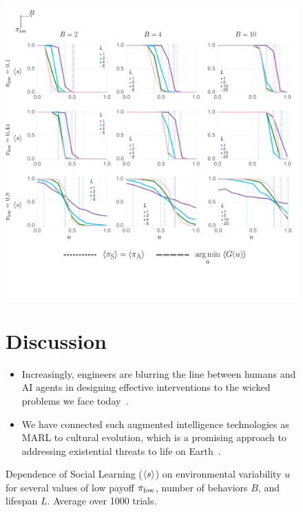 \documentclass[letterpaper,11.5pt]{scrartcl}
\begin{document}
\begin{figure}
  \caption{Dependence of Social Learning ($\langle s \rangle$) on environmental
  variability $u$ for several values of low payoff $\pi_{\mathrm{low}}$, number of
  behaviors $B$, and lifespan $L$. Average over 1000 trials.} 
  \label{fig:evolutionOfSL}
  \includegraphics[width=\textwidth]{mainResultsPlots.pdf}








\section{Discussion}

\begin{itemize}
  \item 
    Increasingly, engineers are blurring the line between humans and AI agents in designing
    effective interventions to the wicked problems we face
    today~\cite{Irrgang2021,Rolnick2022}.
  \item
    We have connected such augmented intelligence technologies as MARL to
    cultural evolution, which is a promising approach to addressing existential
    threats to life on Earth~\cite{Jones2021}.
\end{itemize}




\end{figure}
\end{document}
